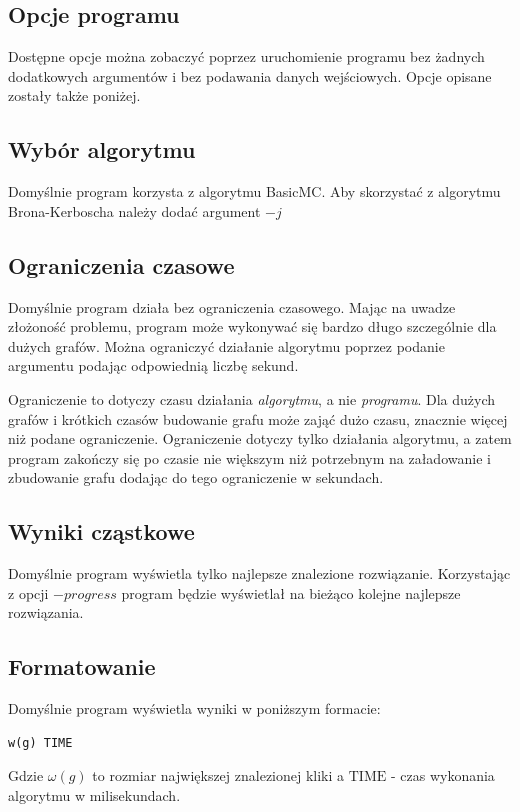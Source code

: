 \documentclass[12pt, a4paper]{article}
\begin{document}
\subsection{Opcje programu}
Dostępne opcje można zobaczyć poprzez uruchomienie programu bez żadnych dodatkowych argumentów i bez podawania danych wejściowych. Opcje opisane zostały także poniżej.

\subsection{Wybór algorytmu}
Domyślnie program korzysta z algorytmu BasicMC. Aby skorzystać z algorytmu Brona-Kerboscha należy dodać argument $-j$

\subsection{Ograniczenia czasowe}
Domyślnie program działa bez ograniczenia czasowego. Mając na uwadze złożoność problemu, program może wykonywać się bardzo długo szczególnie dla dużych grafów. Można ograniczyć działanie algorytmu poprzez podanie argumentu \emph{} podając odpowiednią liczbę sekund.

Ograniczenie to dotyczy czasu działania \emph{algorytmu}, a nie \emph{programu}. Dla dużych grafów i krótkich czasów budowanie grafu może zająć dużo czasu, znacznie więcej niż podane ograniczenie. Ograniczenie dotyczy tylko działania algorytmu, a zatem program zakończy się po czasie nie większym niż potrzebnym na załadowanie i zbudowanie grafu dodając do tego ograniczenie w sekundach.

\subsection{Wyniki cząstkowe}
Domyślnie program wyświetla tylko najlepsze znalezione rozwiązanie. Korzystając z opcji $-progress$ program będzie wyświetlał na bieżąco kolejne najlepsze rozwiązania.

\subsection{Formatowanie}
Domyślnie program wyświetla wyniki w poniższym formacie:

\begin{verbatim}
w(g) TIME
\end{verbatim}
Gdzie $\omega(g)$ to rozmiar największej znalezionej kliki a $\text{TIME}$ - czas wykonania algorytmu w milisekundach.
\end{document}
